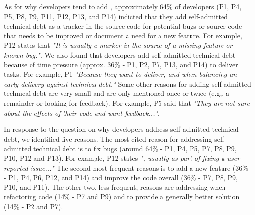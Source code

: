 As for why developers tend to add \SATD, approximately 64\% of developers (P1, P4, P5, P8, P9, P11, P12, P13, and P14) indicted that they add self-admitted technical debt as a tracker in the source code for potential bugs or source code that needs to be improved or document a need for a new feature. For example, P12 states that \textit{"It is usually a marker in the source of a missing feature or known bug."}. We also found that developers add self-admitted technical debt because of time pressure (approx. 36\% - P1, P2, P7, P13, and P14) to deliver tasks. For example, P1 \textit{"Because they want to deliver, and when balancing an early delivery against technical debt."} Some other reasons for adding self-admitted technical debt are very small and are only mentioned once or twice (e.g,. a remainder or looking for feedback). For example, P5 said that \textit{"They are not sure about the effects of their code and want feedback..."}.

In response to the question on why developers address self-admitted technical debt, we identified five reasons. The most cited reason for addressing self-admitted technical debt is to fix bugs (around 64\% - P1, P4, P5, P7, P8, P9, P10, P12 and P13). For example, P12 states \textit{", usually as part of fixing a user-reported issue..."} The second most frequent reasons is to add a new feature (36\% - P1, P4, P6, P12, and P14) and improve the code overall (36\% - P7, P8, P9, P10, and P11). The other two, less frequent, reasons are addressing \SATD when refactoring code (14\% - P7 and P9) and to provide a generally better solution (14\% - P2 and P7). 



